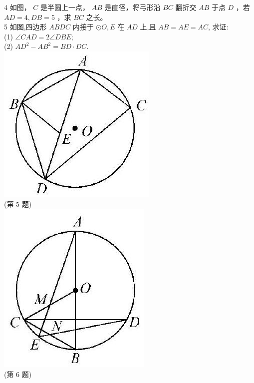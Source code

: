 \documentclass[10pt]{article}
\begin{document}
4 如图， $C$ 是半圆上一点， $A B$ 是直径，将弓形沿 $B C$ 翻折交 $A B$ 于点 $D$ ，若 $A D=4, D B=5$ ，求 $B C$ 之长。\\
5 如图,四边形 $A B D C$ 内接于 $\odot O, E$ 在 $A D$ 上,且 $A B=A E=A C$, 求证:\\
(1) $\angle C A D=2 \angle D B E$;\\
(2) $A D^{2}-A B^{2}=B D \cdot D C$.\\
\includegraphics[max width=\textwidth, center]{2024_10_30_66b8e5e701da2093c133g-027}\\
(第 5 题)\\
\includegraphics[max width=\textwidth, center]{2024_10_30_66b8e5e701da2093c133g-027(2)}\\
(第 6 题)
\end{document}
